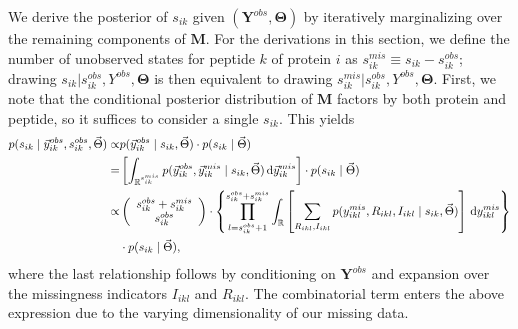 We derive the posterior of $s_{ik}$ given $(\bm {Y}^{obs}, \bm{\Theta})$ by iteratively marginalizing over the remaining components of $\bm M$.
For the derivations in this section, we define the number of unobserved states for peptide $k$ of protein $i$ as $s_{ik}^{mis} \equiv s_{ik} - s_{ik}^{obs}$; drawing $s_{ik} | s_{ik}^{obs}, Y^{obs}, \bm \Theta$ is then equivalent to drawing $s_{ik}^{mis} | s_{ik}^{obs}, Y^{obs}, \bm \Theta$.
First, we note that the conditional posterior distribution of $\bm M$ factors by both protein and peptide, so it suffices to consider a single $s_{ik}$.
This yields
%
\begin{align}
 p( s_{ik} \mid \vec{y}_{ik}^{obs}, s_{ik}^{obs}, \vec{\Theta} ) \propto& p( \vec{y}_{ik}^{obs} \mid s_{ik}, \vec{\Theta} ) \cdot p(s_{ik} \mid \vec{\Theta} ) \\
 =&
\left[ \int_{\mathbb{R}^{s_{ik}^{mis}}} p(\vec{y}_{ik}^{obs}, \vec{y}_{ik}^{mis} \mid s_{ik}, \vec{\Theta}) \, \mathrm{d}\vec{y}_{ik}^{mis} \right] \cdot p(s_{ik} \mid \vec{\Theta}) \\
\nonumber
\propto&
\left(\begin{array}{c}
s_{ik}^{obs}+s_{ik}^{mis}\\
s_{ik}^{obs}
\end{array}\right) \cdot
\left\{ 
\prod_{l=s_{ik}^{obs}+1}^{s_{ik}^{obs}+s_{ik}^{mis}} \int_{\mathbb{R}}
\left[ \sum_{R_{ikl},I_{ikl}} 
p(y_{ikl}^{mis}, R_{ikl},I_{ikl} \mid s_{ik}, \vec{\Theta}) 
\right]
\, \mathrm{d}y_{ikl}^{mis} 
\right\} \\
&\cdot p(s_{ik} \mid \vec{\Theta}) ,
\end{align}
where the last relationship follows by conditioning on $\bm{Y}^{obs}$ and expansion over the missingness indicators $I_{ikl}$ and $R_{ikl}$.
The combinatorial term enters the above expression due to the varying dimensionality of our missing data.

